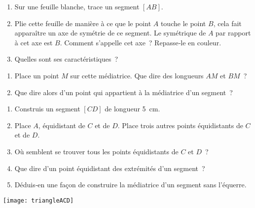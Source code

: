 \begin{activite}

 \begin{partie}
 
 \begin{enumerate}
  \item Sur une feuille blanche, trace un segment $[AB]$.
  \item Plie cette feuille de manière à ce que le point $A$ touche le point $B$, cela fait apparaître un axe de symétrie de ce segment. Le symétrique de $A$ par rapport à cet axe est $B$. Comment s'appelle cet axe ? Repasse‑le en couleur.
  \item Quelles sont ses caractéristiques ?
  \end{enumerate}
  
  \end{partie}
  
 \begin{partie}
 
 \begin{enumerate}
  \item Place un point $M$ sur cette médiatrice. Que dire des longueurs $AM$ et $BM$ ?
  \item Que dire alors d'un point qui appartient à la médiatrice d'un segment ?
  \end{enumerate}
  
  \end{partie}
  
 \begin{partie}
 
 \begin{minipage}[c]{0.76\linewidth}
 \begin {enumerate}
  \item Construis un segment $[CD]$ de longueur 5 cm. 
  \item Place $A$, équidistant de $C$ et de $D$. Place trois autres points équidistants de $C$ et de $D$. 
  \item Où semblent se trouver tous les points équidistants de $C$ et $D$ ?
  \item Que dire d'un point équidistant des extrémités d'un segment ?
  \item Déduis‑en une façon de construire la médiatrice d'un segment sans l'équerre. 
  \end{enumerate} 
  \end{minipage} \hfill %
 \begin{minipage}[c]{0.2\linewidth}
 \texttt{[image: triangleACD]}
  \end{minipage} \\
  
 \end{partie}

\end{activite}

